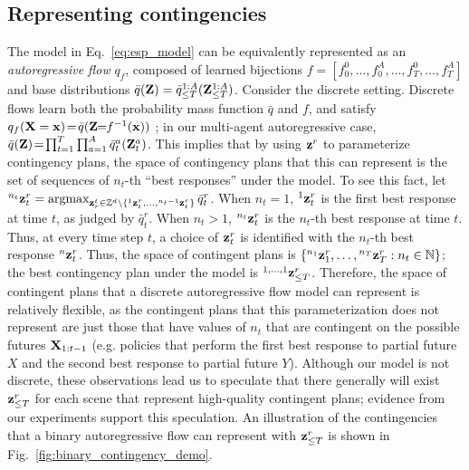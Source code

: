 \subsection{Representing contingencies}
 The model in Eq.~\ref{eq:esp_model} can be equivalently represented as an \emph{autoregressive flow} $q_f$, composed of learned bijections $f=[f_0^0, \dots, f_0^A, \dots, f_T^0, \dots, f_T^A]$ and base distributions $\bar{q}(\mathbf{Z})=\bar{q}_{\leq T}^{1:A}(\mathbf{Z}_{\leq T}^{1:A})$. Consider the discrete setting. Discrete flows learn both the probability mass function $\bar{q}$ and $f$, and satisfy $q_f(\mathbf{X}=\mathbf{x})\!=\!\bar{q}(\mathbf{Z}\!\!=\!\!f^{-1}(\mathbf{x}))$ \citep{tran2019discrete}; in our multi-agent autoregressive case, $\bar{q}(\mathbf{Z})\!=\!\prod_{t=1}^T\prod_{a=1}^A\bar{q}_t^a(\mathbf{Z}_t^a)$. 
This implies that by using $\mathbf{z}^r$ to parameterize contingency plans, the space of contingency plans that this can represent is the set of sequences of $n_t$-th ``best responses'' under the model.  
 To see this fact, let ${}^{n_t}\mathbf{z}_t^r=\operatorname{argmax}_{\mathbf{z}^t_r \in \mathbb Z^d \setminus \{{}^1\mathbf{z}_t^r, \dots, {}^{n_t-1}\mathbf{z}_t^r\}} \bar{q}_t^r$. When $n_t=1$, ${}^1\mathbf{z}_t^r$ is the first best response at time $t$, as judged by $\bar{q}_t^r$. When $n_t>1$, ${}^{n_t}\mathbf{z}_t^r$ is the $n_t$-th best response at time $t$. Thus, at every time step $t$, a choice of $\mathbf{z}_t^r$ is identified with the $n_t$-th best response ${}^n\mathbf{z}_t^r$. Thus, the space of contingent plans is $\{{}^{n_{1}}\mathbf{z}_{1}^r, \dots, {}^{n_{T}}\mathbf{z}_{T}^r : n_{t} \in \mathbb N\}$; the best contingency plan under the model is ${}^{1,\dots,1}\mathbf{z}^r_{\leq T}$. Therefore, the space of contingent plans that a discrete autoregressive flow model can represent is relatively flexible, as the contingent plans that this parameterization does not represent are just those that have values of $n_t$ that are contingent on the possible futures $\mathbf{X}_{1:t-1}$ (e.g. policies that perform the first best response to partial future $X$ and the second best response to partial future $Y$).  Although our model is not discrete, these observations lead us to speculate
 that there generally will exist $\mathbf{z}_{\leq T}^r$ for each scene that represent high-quality contingent plans; evidence from our experiments support this speculation. An illustration of the contingencies that a binary autoregressive flow can represent with $\mathbf{z}_{\leq T}^r$ is shown in Fig.~\ref{fig:binary_contingency_demo}.

